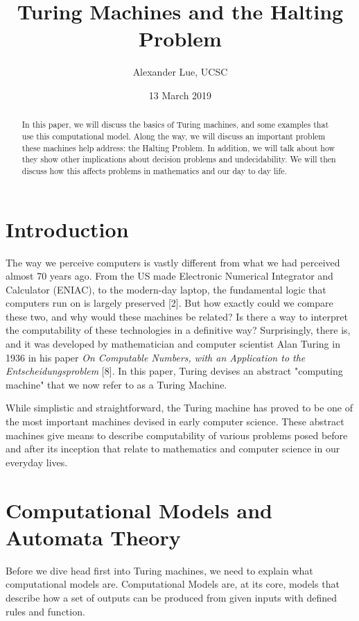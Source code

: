 \documentclass[12pt]{article}
\title{Turing Machines and the Halting Problem}
\author{Alexander Lue, UCSC}
\date{13 March 2019}
\begin{document}
\maketitle

\begin{abstract}
	In this paper, we will discuss the basics of Turing machines, and some examples that use this computational model. Along the way, we will discuss an important problem these machines help address: the Halting Problem. In addition, we will talk about how they show other implications about decision problems and undecidability. We will then discuss how this affects problems in mathematics and our day to day life.
\end{abstract}



\section{Introduction}

The way we perceive computers is vastly different from what we had perceived almost 70 years ago. From the US made Electronic Numerical Integrator and Calculator (ENIAC), to the modern-day laptop, the fundamental logic that computers run on is largely preserved [2]. But how exactly could we compare these two, and why would these machines be related? Is there a way to interpret the computability of these technologies in a definitive way? Surprisingly, there is, and it was developed by mathematician and computer scientist Alan Turing in 1936 in his paper \textit{On Computable Numbers, with an Application to the Entscheidungsproblem} [8]. In this paper, Turing devises an abstract "computing machine" that we now refer to as a Turing Machine.

While simplistic and straightforward, the Turing machine has proved to be one of the most important machines devised in early computer science. These abstract machines give means to describe computability of various problems posed before and after its inception that relate to mathematics and computer science in our everyday lives.



\section{Computational Models and Automata Theory}

Before we dive head first into Turing machines, we need to explain what computational models are. Computational Models are, at its core, models that describe how a set of outputs can be produced from given inputs with defined rules and function. 
\end{document}
